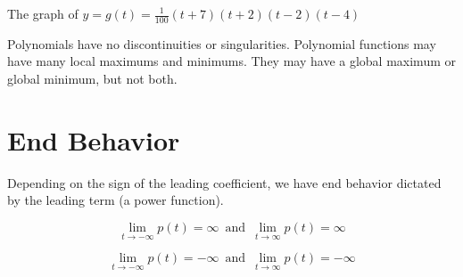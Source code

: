 \documentclass{ximera}
\begin{document}
\begin{example}


The graph of $y = g(t) = \frac{1}{100} (t+7) (t+2) (t-2) (t-4) $


\begin{image}
\end{image}

\end{example}


Polynomials have no discontinuities or singularities.  Polynomial functions may have many local maximums and minimums. They may have a global maximum or global minimum, but not both.














\section{End Behavior}



Depending on the sign of the leading coefficient, we have end behavior dictated by the leading term (a power function).




\[    \lim_{t \to -\infty} p(t) =  \infty  \,   \text{ and }  \,     \lim_{t \to \infty} p(t) = \infty      \]

\[    \lim_{t \to -\infty} p(t) =  -\infty  \,   \text{ and }  \,     \lim_{t \to \infty} p(t) = -\infty      \]
\end{document}
